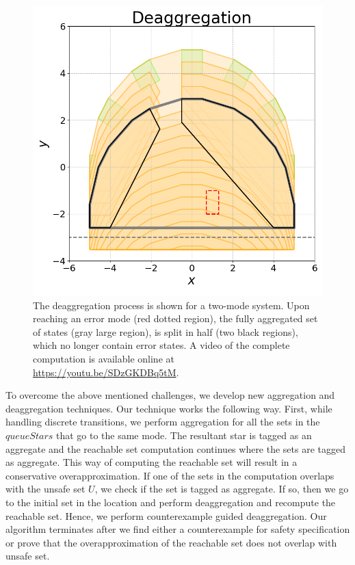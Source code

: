 \begin{figure}[t]
\centerline{\includegraphics[width=0.8\columnwidth]{images/deagg.png}}
\caption{The deaggregation process is shown for a two-mode system. Upon reaching an error mode (red dotted region), the fully aggregated set of states (gray large region), is split in half (two black regions), which no longer contain error states. A video of the complete computation is available online at \url{https://youtu.be/SDzGKDBq5tM}.}
\label{fig:deagg}
\end{figure}


To overcome the above mentioned challenges, we develop new aggregation and deaggregation techniques. Our technique works the following way. 
First, while handling discrete transitions, we perform aggregation for all the sets in the $queueStars$ that go to the same mode. 
%
The resultant star is tagged as an \textsf{aggregate} and the reachable set computation continues where the sets are tagged as \textsf{aggregate}. 
%
This way of computing the reachable set will result in a conservative overapproximation.
%
If one of the sets in the computation overlaps with the unsafe set $U$, we check if the set is tagged as \textsf{aggregate}.
%
If so, then we go to the initial set in the location and perform deaggregation and recompute the reachable set.
%
Hence, we perform counterexample guided deaggregation.
%
Our algorithm terminates after we find either a counterexample for safety specification or prove that the overapproximation of the reachable set does not overlap with unsafe set.

